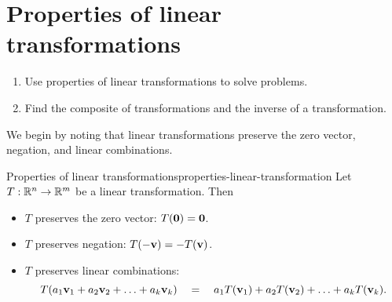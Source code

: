 \section{Properties of linear transformations}

\begin{outcome}
  \begin{enumerate}
  \item Use properties of linear transformations to solve problems.
  \item Find the composite of transformations and the inverse of a
    transformation.
  \end{enumerate}
\end{outcome}

We begin by noting that linear transformations preserve the zero
vector, negation, and linear combinations.

\begin{proposition}{Properties of linear transformations}{properties-linear-transformation}
  Let $T: \mathbb{R}^n \to \mathbb{R}^m$ be a linear transformation. Then
  \begin{itemize}
  \item $T$ preserves the zero vector: $T(\mbox{\bf 0}) = \mbox{\bf 0}$.
  \item $T$ preserves negation: $T(-\mbox{\bf v}) = -T(\mbox{\bf v})$.
  \item $T$ preserves linear combinations:
    \begin{equation*}
      T(a_1\mbox{\bf v}_1 + a_2\mbox{\bf v}_2 + \ldots + a_k \mbox{\bf v}_k)
      \quad=\quad
      a_1T(\mbox{\bf v}_1) + a_2T(\mbox{\bf v}_2) + \ldots + a_k T(\mbox{\bf v}_k).
    \end{equation*}
  \end{itemize}
\end{proposition}


